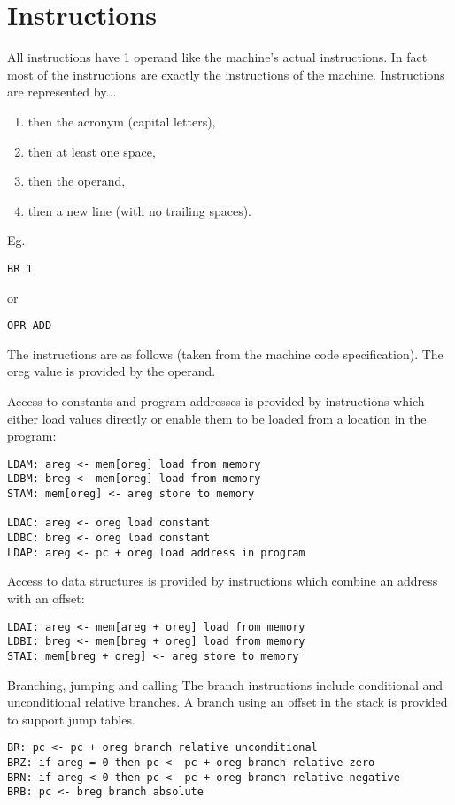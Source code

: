 \documentclass[10pt,a4paper]{article}
\begin{document}
\section{Instructions}

All instructions have 1 operand like the machine's actual instructions. In fact most of the instructions are exactly the instructions of the machine. Instructions are represented by...
\begin{enumerate}
\item then the acronym (capital letters),
\item then at least one space,
\item then the operand,
\item then a new line (with no trailing spaces).
\end{enumerate}

\newpage

\noindent Eg.
\begin{lstlisting}[frame=single]
  BR 1
\end{lstlisting}
or
\begin{lstlisting}[frame=single]
  OPR ADD
\end{lstlisting}

\noindent The instructions are as follows (taken from the machine code specification). The oreg value is provided by the operand.
\break

Access to constants and program addresses is provided by instructions which either
load values directly or enable them to be loaded from a location in the program:
\begin{verbatim}
LDAM: areg <- mem[oreg] load from memory
LDBM: breg <- mem[oreg] load from memory
STAM: mem[oreg] <- areg store to memory

LDAC: areg <- oreg load constant
LDBC: breg <- oreg load constant
LDAP: areg <- pc + oreg load address in program
\end{verbatim}

Access to data structures is provided by instructions which combine an address
with an offset:
\begin{verbatim}
LDAI: areg <- mem[areg + oreg] load from memory
LDBI: breg <- mem[breg + oreg] load from memory
STAI: mem[breg + oreg] <- areg store to memory
\end{verbatim}

Branching, jumping and calling
The branch instructions include conditional and unconditional relative branches.
A branch using an offset in the stack is provided to support jump tables.
\begin{verbatim}
BR: pc <- pc + oreg branch relative unconditional
BRZ: if areg = 0 then pc <- pc + oreg branch relative zero
BRN: if areg < 0 then pc <- pc + oreg branch relative negative
BRB: pc <- breg branch absolute
\end{verbatim}
\end{document}
